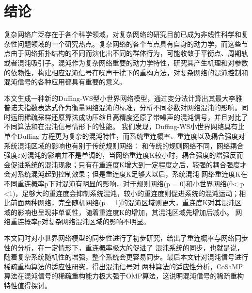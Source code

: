 \chapter{结论}
复杂网络广泛存在于各个科学领域，对复杂网络的研究目前已成为非线性科学和复杂性问题领域的一个研究热点。复杂网络的各个节点具有自身的动力学，而这些节点由于网络拓扑结构的不同而演化出不同的群体行为，可能收敛于平衡点、周期轨或者混沌吸引子。混沌作为复杂网络重要的动力学特性，研究其产生机理和对参数的依赖性，构建相应混沌信号在噪声干扰下的重构方法，对复杂网络的混沌控制和混沌信号的各种应用都具有重要的意义。
\par 本文生成一种新的Duffing-WS型小世界网络模型，通过变分法计算出其最大李雅普诺夫指数表达式作为衡量网络混沌的标准，分析不同参数对网络混沌的影响。同时运用稀疏采样还原算法成功压缩且高精度还原了带噪声的混沌信号，并且对比了不同算法和在混沌信号情形下的性能。
我们发现，Duffing-WS小世界网络具有比单个Duffing-方程更为复杂的混沌特性，而系统重连概率、重连度以及耦合强度对系统混沌区域的影响也有别于传统规则网络：
和传统的规则网络不同，网络耦合强度$\varepsilon$对混沌的影响并不是单调的，当网络重连度K较小时，耦合强度的增强反而会促进系统的混沌现象；只有在重连度K增大到一定程度之后，较强的耦合强度才会对系统混沌起到控制效果；但是重连度K足够大以后，系统混沌
网络重连度K在不同重连概率p下对混沌有明显的影响，对于规则网络(p = 0)和小世界网络(0< p <1)，足够大的重连度会抑制系统混沌，较小的重连度则促进系统的混沌运动；相比前面两种网络，完全随机网络(p = 1)的混沌区域则更大，重连度K对其混沌区域的影响也呈现非单调性，随着重连度K的增加，其混沌区域先增加后减小。
网络重连概率p对复杂网络混沌区域的影响不明显。\par
本文同时对小世界网络模型的同步性进行了初步研究，给出了重连概率与网络同步性的分析，在一定情形下，重连概率极大的促进了
混沌系统的同步，也就是说，随着复杂系统随机性的增强，整个系统会更容易同步。最后本文针对混沌信号进行稀疏重构算法的适应性研究，得出混沌信号对
两种算法的适应性分析，CoSaMP算法在混沌信号的稀疏重构能力极大强于OMP算法，这说明混沌信号的稀疏重构特性值得探讨。